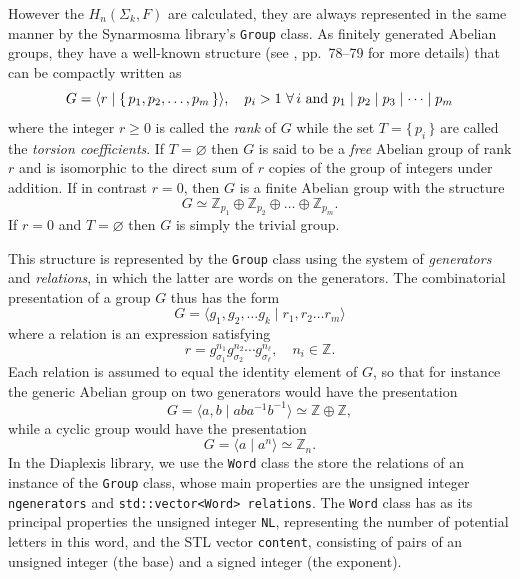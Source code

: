 \documentclass[12pt,letterpaper]{report}
\begin{document}
However the $H_n(\Sigma_k,F)$ are calculated, they are always represented in the same manner by the Synarmosma 
library's \texttt{Group} class. As finitely generated Abelian groups, they have a well-known structure (see 
\cite{Hungerford}, pp.\ 78--79 for more details) that can be compactly written as 
\begin{equation}
G = \langle r \mid \{\, p_1,p_2,\dots,p_m \,\} \rangle, \quad p_i > 1 \,\, \forall \, i \textnormal{ and } 
p_1\mid p_2 \mid p_3 \mid \dotsb \mid p_m
\end{equation}
where the integer $r \ge 0$ is called the \emph{rank} of $G$ while the set $T = \{\, p_i \,\}$ are called the 
\emph{torsion coefficients}. If $T=\varnothing$ then $G$ is said to be a \emph{free} Abelian group 
of rank $r$ and is isomorphic to the direct sum of $r$ copies of the group of integers under addition. 
If in contrast $r=0$, then $G$ is a finite Abelian group with the structure 
\begin{equation*}
G \simeq \mathbb{Z}_{p_1} \oplus \mathbb{Z}_{p_2} \oplus \dots \oplus \mathbb{Z}_{p_m}. 
\end{equation*}
If $r = 0$ and $T = \varnothing$ then $G$ is simply the trivial group. 

This structure is represented by the \texttt{Group} class using the system of \emph{generators} and 
\emph{relations}, in which the latter are words on the generators. The combinatorial presentation 
of a group $G$ thus has the form
\begin{equation}
G = \langle g_1,g_2,\dots g_k \mid r_1,r_2\dots r_m \rangle
\end{equation} 
where a relation is an expression satisfying
\begin{equation}
r = g_{\sigma_1}^{n_1} g_{\sigma_2}^{n_2} \dotsb g_{\sigma_\ell}^{n_\ell}, \quad n_i \in \mathbb{Z}.
\end{equation}
Each relation is assumed to equal the identity element of $G$, so that for instance the generic Abelian group on 
two generators would have the presentation 
\begin{equation*}
G = \langle a,b \mid aba^{-1}b^{-1} \rangle \simeq \mathbb{Z} \oplus \mathbb{Z},
\end{equation*}
while a cyclic group would have the presentation
\begin{equation*}
G = \langle a \mid a^n \rangle \simeq \mathbb{Z}_n. 
\end{equation*} 
In the Diaplexis library, we use the \texttt{Word} class the store the relations of an instance of the \texttt{Group} 
class, whose main properties are the unsigned integer \texttt{ngenerators} and \texttt{std::vector<Word> relations}. 
The \texttt{Word} class has as its principal properties the unsigned integer \texttt{NL}, representing the 
number of potential letters in this word, and the STL vector \texttt{content}, consisting of pairs of an 
unsigned integer (the base) and a signed integer (the exponent).
\end{document}
